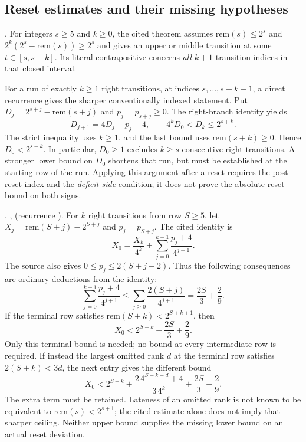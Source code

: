 \subsection{Reset estimates and their missing hypotheses}

\begin{obs}
.
For integers $s\ge5$ and $k\ge0$, the cited theorem assumes
$\mathrm{rem}(s)\le2^s$ and
$2^k(2^s-\mathrm{rem}(s))\ge2^s$ and gives an upper or middle
transition at some $t\in[s,s+k]$.  Its literal contrapositive concerns
\emph{all} $k+1$ transition indices in that closed interval.

For a run of exactly $k\ge1$ right transitions, at indices
$s,\ldots,s+k-1$, a direct recurrence gives the sharper conventionally
indexed statement.  Put $D_j=2^{s+j}-\mathrm{rem}(s+j)$ and
$p_j=p^-_{s+j}\ge0$.  The right-branch identity yields
\[
 D_{j+1}=4D_j+p_j+4,\qquad
 4^kD_0<D_k\le2^{s+k}.
\]
The strict inequality uses $k\ge1$, and the last bound uses
$\mathrm{rem}(s+k)\ge0$.  Hence $D_0<2^{s-k}$.
In particular, $D_0\ge1$ excludes $k\ge s$ consecutive right
transitions.  A stronger lower bound on $D_0$ shortens that run, but
must be established at the starting row of the run.  Applying this
argument after a reset requires the post-reset index and the
\emph{deficit-side} condition; it does not prove the absolute reset
bound on both signs.
\end{obs}

\begin{obs}
\label{obs:affine-excess-recurrence}
,
,
(recurrence ).
For $k$ right transitions from row $S\ge5$, let
$X_j=\mathrm{rem}(S+j)-2^{S+j}$ and $p_j=p^-_{S+j}$.
The cited identity is
\[
 X_0=\frac{X_k}{4^k}+\sum_{j=0}^{k-1}\frac{p_j+4}{4^{j+1}}.
\]
The source also gives $0\le p_j\le2(S+j-2)$.  Thus the following
consequences are ordinary deductions from the identity:
\[
 \sum_{j=0}^{k-1}\frac{p_j+4}{4^{j+1}}
 \le\sum_{j\ge0}\frac{2(S+j)}{4^{j+1}}
 =\frac{2S}{3}+\frac29.
\]
If the terminal row satisfies $\mathrm{rem}(S+k)<2^{S+k+1}$, then
\[
 X_0<2^{S-k}+\frac{2S}{3}+\frac29.
\]
Only this terminal bound is needed; no bound at every intermediate row
is required.  If instead the largest omitted rank $d$ at the terminal
row satisfies $2(S+k)<3d$, the next entry gives the different bound
\[
 X_0<2^{S-k}+\frac{2\,4^{S+k-d}+4}{3\,4^k}
                +\frac{2S}{3}+\frac29.
\]
The extra term must be retained.  Lateness of an omitted rank is not
known to be equivalent to $\mathrm{rem}(s)<2^{s+1}$; the cited estimate
alone does not imply that sharper ceiling.  Neither upper bound supplies
the missing lower bound on an actual reset deviation.
\end{obs}

